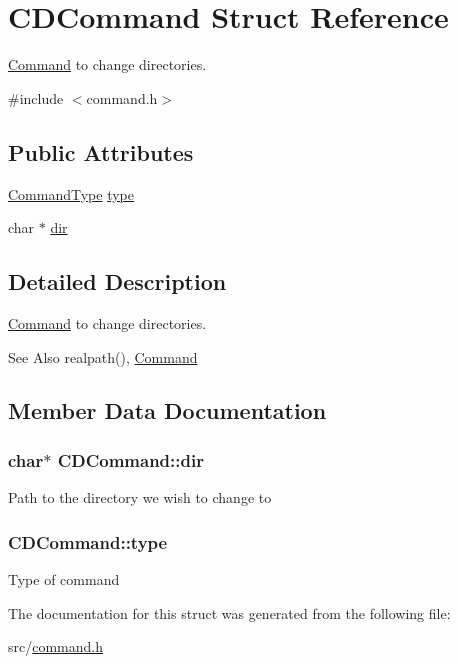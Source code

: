 \hypertarget{structCDCommand}{\section{C\-D\-Command Struct Reference}
\label{structCDCommand}
}


\hyperlink{unionCommand}{Command} to change directories.  




{\ttfamily \#include $<$command.\-h$>$}

\subsection*{Public Attributes}
\begin{DoxyCompactItemize}
\item 
\hyperlink{command_8h_a21e038f5b8958e203d28bc4f18472352}{Command\-Type} \hyperlink{structCDCommand_a8e57e7a2c0aa827e7f211cd0b99483f6}{type}
\item 
char $\ast$ \hyperlink{structCDCommand_a3696e9b5a96ed447056a4753906277d1}{dir}
\end{DoxyCompactItemize}


\subsection{Detailed Description}
\hyperlink{unionCommand}{Command} to change directories. 

\begin{DoxySeeAlso}{See Also}
realpath(), \hyperlink{unionCommand}{Command} 
\end{DoxySeeAlso}


\subsection{Member Data Documentation}
\hypertarget{structCDCommand_a3696e9b5a96ed447056a4753906277d1}{
\subsubsection[{dir}]{\setlength{\rightskip}{0pt plus 5cm}char$\ast$ C\-D\-Command\-::dir}}\label{structCDCommand_a3696e9b5a96ed447056a4753906277d1}
Path to the directory we wish to change to \hypertarget{structCDCommand_a8e57e7a2c0aa827e7f211cd0b99483f6}{
\subsubsection[{type}]{ C\-D\-Command\-::type}}\label{structCDCommand_a8e57e7a2c0aa827e7f211cd0b99483f6}
Type of command 

The documentation for this struct was generated from the following file\-:\begin{DoxyCompactItemize}
\item 
src/\hyperlink{command_8h}{command.\-h}\end{DoxyCompactItemize}
